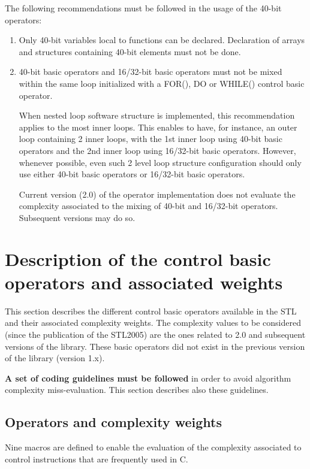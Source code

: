 The following recommendations must be followed in the usage of the
40-bit operators:
\begin{enumerate}
    \item Only 40-bit variables local to functions can be declared.
    Declaration of arrays and structures containing 40-bit elements
    must not be done.
    \item 40-bit basic operators and 16/32-bit basic
    operators must not be mixed within the same loop initialized with
    a FOR(), DO or WHILE() control basic operator.

    When nested loop software structure is implemented, this
    recommendation applies to the most inner loops. This enables to
    have, for instance, an outer loop containing 2 inner loops, with
    the 1st inner loop using 40-bit basic operators and the 2nd inner
    loop using 16/32-bit basic operators. However, whenever possible,
    even such 2 level loop structure configuration should only use
    either 40-bit basic operators or 16/32-bit basic operators.

    Current version (2.0) of the operator implementation does not
    evaluate the complexity associated to the mixing of 40-bit and
    16/32-bit operators. Subsequent versions may do so.
\end{enumerate}

\section{Description of the control basic operators and associated weights}

This section describes the different control basic operators
available in the STL and their associated complexity weights. The
complexity values to be considered (since the publication of the
STL2005) are the ones related to 2.0 and subsequent versions of the library.
These basic operators did not exist in the previous version of the
library (version 1.x).

\textbf{A set of coding guidelines must be followed} in order to
avoid algorithm complexity miss-evaluation. This section describes
also these guidelines.

\subsection{Operators and complexity weights}
Nine macros are defined to enable the evaluation of the complexity
associated to control instructions that are frequently used in C.

